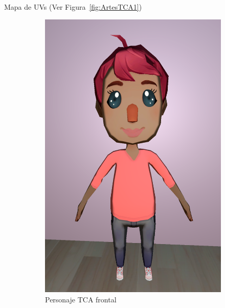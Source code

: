 \documentclass[12pt, a4paper,twoside,titlepage]{book}
\begin{document}
 Mapa de UVs (Ver Figura~\ref{fig:ArtesTCA1})
 
 \begin{figure}
\centering
\begin{subfigure}{.5\textwidth}
  \centering
  \includegraphics[width=.95\linewidth]{TGF/Artes/TCA_front.png}
  \caption{Personaje TCA frontal}
\end{subfigure}%
\begin{subfigure}{.5\textwidth}
  \centering

\end{subfigure}
\end{figure}
\end{document}
